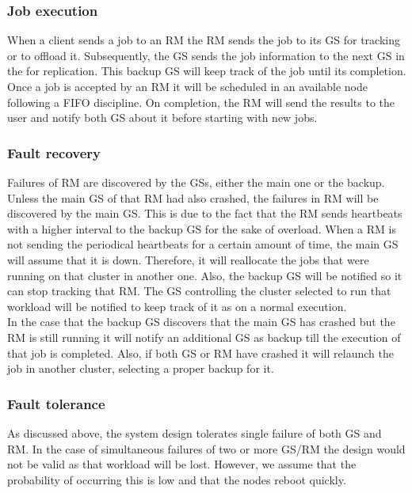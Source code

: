 \subsubsection{Job execution}
When a client sends a job to an RM the RM sends the job to its GS for tracking or to offload it. Subsequently, the GS sends the job information to the next GS in the for replication.
This backup GS will keep track of the job until its completion.
Once a job is accepted by an RM it will be scheduled in an available node following a FIFO discipline. On completion, the RM will send the results to the user and notify both GS about it before starting with new jobs.

\subsubsection{Fault recovery}
Failures of RM are discovered by the GSs, either the main one or the backup. Unless the main GS of that RM had also crashed, the failures in RM will be discovered by the main GS. This is due to the fact that the RM sends heartbeats with a higher interval to the backup GS for the sake of overload. When a RM is not sending the periodical heartbeats for a certain amount of time, the main GS will assume that it is down. Therefore, it will reallocate the jobs that were running on that cluster in another one. Also, the backup GS will be notified so it can stop tracking that RM. The GS controlling the cluster selected to run that workload will be notified to keep track of it as on a normal execution.
\\
In the case that the backup GS discovers that the main GS has crashed but the RM is still running it will notify an additional GS as backup till the execution of that job is completed. Also, if both GS or RM have crashed it will relaunch the job in another cluster, selecting a proper backup for it.
\subsubsection{Fault tolerance}
As discussed above, the system design tolerates single failure of both GS and RM. In the case of simultaneous failures of two or more GS/RM the design would not be valid as that workload will be lost. However, we assume that the probability of occurring this is low and that the nodes reboot quickly. 

